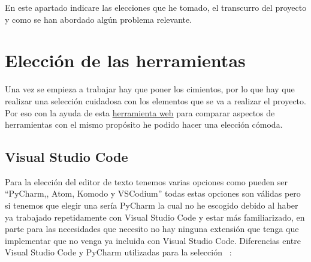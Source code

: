 
En este apartado indicare las elecciones que he tomado, el transcurro del proyecto y como se han abordado algún problema relevante.
\section{Elección de las herramientas}
Una vez se empieza a trabajar hay que poner los cimientos, por lo que hay que realizar una selección cuidadosa con los elementos que se va a realizar el proyecto. Por eso con la ayuda de esta \href{ https://stackshare.io/stackups/trending }{ herramienta web} para comparar aspectos de herramientas con el mismo propósito he podido hacer una elección cómoda. 
\subsection{Visual Studio Code}
Para la elección del editor de texto tenemos varias opciones como pueden ser “PyCharm,, Atom, Komodo y VSCodium” todas estas opciones son válidas pero si tenemos que elegir una sería PyCharm la cual no he escogido debido al haber ya trabajado repetidamente con Visual Studio Code y estar más familiarizado, en parte para las necesidades que necesito no hay ninguna extensión que tenga que implementar que no venga ya incluida con Visual Studio Code.
Diferencias entre Visual Studio Code y PyCharm utilizadas para la selección ~\cite{VSC-PyCharm}:
